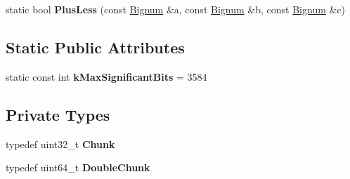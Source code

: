 \begin{DoxyCompactItemize}
\item 
static bool {\bfseries Plus\+Less} (const \hyperlink{classv8_1_1internal_1_1_bignum}{Bignum} \&a, const \hyperlink{classv8_1_1internal_1_1_bignum}{Bignum} \&b, const \hyperlink{classv8_1_1internal_1_1_bignum}{Bignum} \&c)\hypertarget{classv8_1_1internal_1_1_bignum_afe71a5ec7c5f2cfdd617941b5a3942f6}{}\label{classv8_1_1internal_1_1_bignum_afe71a5ec7c5f2cfdd617941b5a3942f6}

\end{DoxyCompactItemize}
\subsection*{Static Public Attributes}
\begin{DoxyCompactItemize}
\item 
static const int {\bfseries k\+Max\+Significant\+Bits} = 3584\hypertarget{classv8_1_1internal_1_1_bignum_a39b4483fcc51510126697c3111aae021}{}\label{classv8_1_1internal_1_1_bignum_a39b4483fcc51510126697c3111aae021}

\end{DoxyCompactItemize}
\subsection*{Private Types}
\begin{DoxyCompactItemize}
\item 
typedef uint32\+\_\+t {\bfseries Chunk}\hypertarget{classv8_1_1internal_1_1_bignum_aacd896a747f8dda26bfdaa0023a0e021}{}\label{classv8_1_1internal_1_1_bignum_aacd896a747f8dda26bfdaa0023a0e021}

\item 
typedef uint64\+\_\+t {\bfseries Double\+Chunk}\hypertarget{classv8_1_1internal_1_1_bignum_a82fa6d436a9aaf0ef682a24fdb8bd45a}{}\label{classv8_1_1internal_1_1_bignum_a82fa6d436a9aaf0ef682a24fdb8bd45a}

\end{DoxyCompactItemize}
